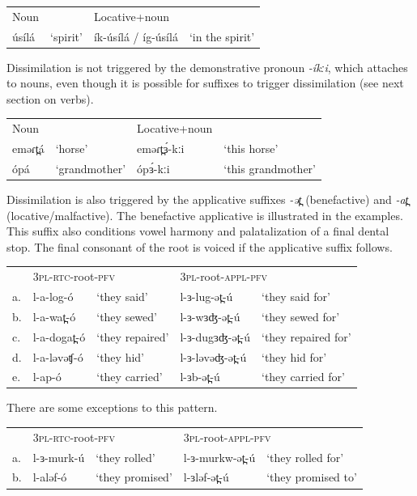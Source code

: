 \ea
\begin{tabular}[t]{llll}
	Noun	&&	Locative+noun\\
	úsílá	&	‘spirit’		&	ík-úsílá / íg-úsílá & ‘in the spirit’    \\
\end{tabular}
\z

Dissimilation is not triggered by the demonstrative pronoun \textit{-íkːi}, which attaches to nouns, even though it is possible for suffixes to trigger dissimilation (see next section on verbs).

\ea
\begin{tabular}[t]{llll}
	Noun	&&		Locative+noun\\
	eməɾt̪á	&	‘horse’	&	eməɾt̪ɜ́-kːi	&	‘this horse’\\
	ópá		&	‘grandmother’&	ópɜ́-kːi	&	‘this grandmother’\\
\end{tabular}
\z

Dissimilation is also triggered by the applicative suffixes \textit{-ət̪} (benefactive) and \textit{-at̪} (locative/malfactive). The benefactive applicative is illustrated in the examples. This suffix also conditions vowel harmony and palatalization of a final dental stop. The final consonant of the root is voiced if the applicative suffix follows. 

\ea
\begin{tabular}[t]{lllll}
&	\multicolumn{2}{l}{3\textsc{pl}-\textsc{rtc}-root-\textsc{pfv}} & \multicolumn{2}{l}{3\textsc{pl}-root-\textsc{appl}-\textsc{pfv}}\\
	a.& l-a-log-ó	&‘they said’		&l-ɜ-lug-ət̪-ú	&‘they said for’\\
	b.&	l-a-wat̪-ó	&‘they sewed’	&l-ɜ-wɜʤ-ət̪-ú	&‘they sewed for’\\
	c.&	l-a-dogat̪-ó	&‘they repaired’	&l-ɜ-dugɜʤ-ət̪-ú	&‘they repaired for’\\
	d.&	l-a-ləvəʧ-ó	&‘they hid’		&l-ɜ-ləvəʤ-ət̪-ú	&‘they hid for’\\
	e.&	l-ap-ó		&‘they carried’	&l-ɜb-ət̪-ú		&‘they carried for’\\
\end{tabular}
\z

There are some exceptions to this pattern.

\ea
\begin{tabular}[t]{lllll}
&	\multicolumn{2}{l}{3\textsc{pl}-\textsc{rtc}-root-\textsc{pfv}} & \multicolumn{2}{l}{3\textsc{pl}-root-\textsc{appl}-\textsc{pfv}}\\
	a.&	l-ɜ-murk-ú 	&‘they rolled’	&l-ɜ-murkw-ət̪-ú	   &‘they rolled for’\\
	b.&	l-aləf-ó  	&‘they promised’	&l-ɜləf-ət̪-ú 	   &‘they promised to’\\
\end{tabular}
\z

